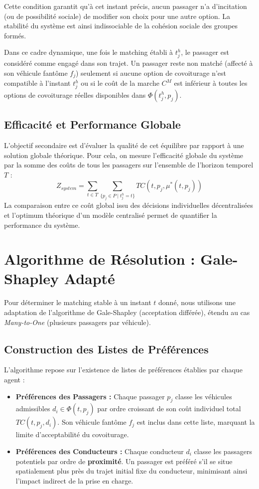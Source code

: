 \documentclass[12pt, a4paper]{article}
\begin{document}
Cette condition garantit qu'à cet instant précis, aucun passager n'a d'incitation (ou de possibilité sociale) de modifier son choix pour une autre option. La stabilité du système est ainsi indissociable de la cohésion sociale des groupes formés.

Dans ce cadre dynamique, une fois le matching établi à $t^h_j$, le passager est considéré comme engagé dans son trajet. Un passager reste non matché (affecté à son véhicule fantôme $f_j$) seulement si aucune option de covoiturage n'est compatible à l'instant $t^h_j$ ou si le coût de la marche $C^M$ est inférieur à toutes les options de covoiturage réelles disponibles dans $\Phi(t^h_j, p_j)$.

\subsection{Efficacité et Performance Globale}
L'objectif secondaire est d'évaluer la qualité de cet équilibre par rapport à une solution globale théorique. Pour cela, on mesure l'efficacité globale du système par la somme des coûts de tous les passagers sur l'ensemble de l'horizon temporel $T$ :
$$ Z_{system} = \sum_{t \in T} \sum_{\{p_j \in P \mid t_j^h = t\}} TC(t, p_j, \mu^*(t, p_j)) $$
La comparaison entre ce coût global issu des décisions individuelles décentralisées et l'optimum théorique d'un modèle centralisé permet de quantifier la performance du système.


\section{Algorithme de Résolution : Gale-Shapley Adapté}
Pour déterminer le matching stable à un instant $t$ donné, nous utilisons une adaptation de l'algorithme de Gale-Shapley (acceptation différée), étendu au cas \textit{Many-to-One} (plusieurs passagers par véhicule).

\subsection{Construction des Listes de Préférences}
L'algorithme repose sur l'existence de listes de préférences établies par chaque agent :
\begin{itemize}
    \item \textbf{Préférences des Passagers :} Chaque passager $p_j$ classe les véhicules admissibles $d_i \in \Phi(t, p_j)$ par ordre croissant de son coût individuel total $TC(t, p_j, d_i)$. Son véhicule fantôme $f_j$ est inclus dans cette liste, marquant la limite d'acceptabilité du covoiturage.

    \item \textbf{Préférences des Conducteurs :} Chaque conducteur $d_i$ classe les passagers potentiels par ordre de \textbf{proximité}. Un passager est préféré s'il se situe spatialement plus près du trajet initial fixe du conducteur, minimisant ainsi l'impact indirect de la prise en charge.
\end{itemize}
\end{document}
